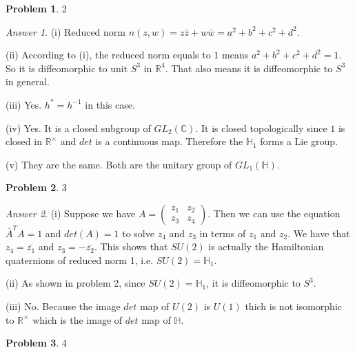 \documentclass[10pt,a4paper]{article}
\theoremstyle{plain}
\theoremstyle{definition}
\newtheorem*{problem*}{Problem}
\theoremstyle{remark}
\newtheorem*{answer*}{Answer}
\newcommand{\IC}{\mathbb{C}}
\newcommand{\IH}{\mathbb{H}}
\newcommand{\IR}{\mathbb{R}}
\newcommand{\<}{\langle}
\renewcommand{\>}{\rangle}
\begin{document}
\begin{problem*} 2
\end{problem*}

\begin{answer*} \hfill

(i) Reduced norm $n(z,w) = z\bar{z}+w\bar{w} = a^2+b^2+c^2+d^2$.

(ii) According to (i), the reduced norm equals to $1$ means $a^2+b^2+c^2+d^2 = 1$. So it is diffeomorphic to unit $S^3$ in $\IR^4$. That also means it is diffeomorphic to $S^3$ in general.

(iii) Yes. $h^* = h^{-1}$ in this case.

(iv) Yes. It is a closed subgroup of $GL_2(\IC)$. It is closed topologically since $1$ is closed in $\IR^\times$ and $det$ is a continuous map. Therefore the $\IH_1$ forms a Lie group.

(v) They are the same. Both are the unitary group of $GL_1(\IH)$. \\
\end{answer*}

\begin{problem*}3
\end{problem*}

\begin{answer*} \hfill

(i) Suppose we have $A = \begin{pmatrix} z_1 & z_2 \\ z_3 & z_4 \end{pmatrix}$. Then we can use the equation $\bar{A}^T A = 1$ and $det(A) = 1$ to solve $z_4$ and $z_3$ in terms of $z_1$ and $z_2$. We have that $z_4 = \bar{z_1}$ and $z_3 = -\bar{z_2}$. This shows that $SU(2)$ is actually the Hamiltonian quaternions of reduced norm 1, i.e. $SU(2) = \IH_1$.

(ii) As shown in problem 2, since $SU(2) = \IH_1$, it is diffeomorphic to $S^3$.

(iii) No. Because the image $det$ map of $U(2)$ is $U(1)$ thich is not isomorphic to $\IR^\times$ which is the image of $det$ map of $\IH$. \\

\end{answer*}

\begin{problem*} 4
\end{problem*}
\end{document}
